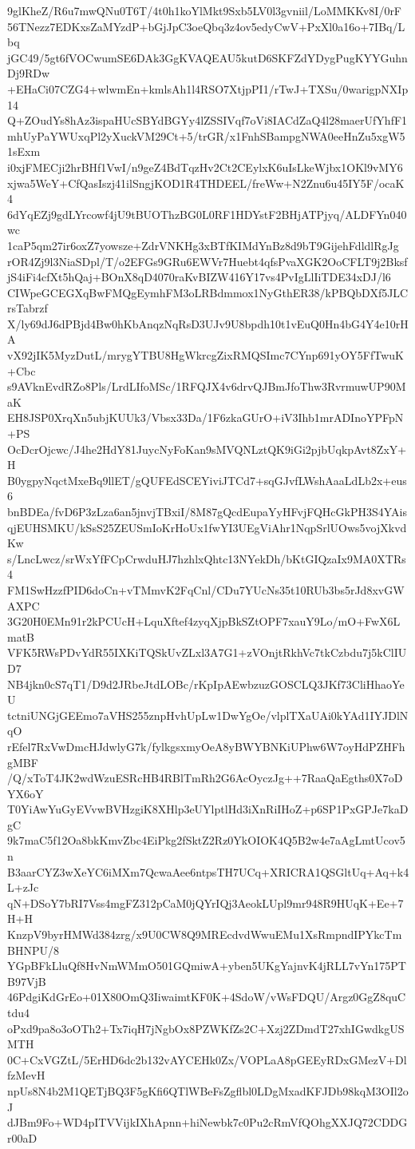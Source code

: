 9glKheZ/R6u7mwQNu0T6T/4t0h1koYlMkt9Sxb5LV0l3gvniil/LoMMKKv8I/0rF
56TNezz7EDKxsZaMYzdP+bGjJpC3oeQbq3z4ov5edyCwV+PxXl0a16o+7IBq/Lbq
jGC49/5gt6fVOCwumSE6DAk3GgKVAQEAU5kutD6SKFZdYDygPugKYYGuhnDj9RDw
+EHaCi07CZG4+wlwmEn+kmlsAh1l4RSO7XtjpPI1/rTwJ+TXSu/0warigpNXIp14
Q+ZOudYs8hAz3ispaHUcSBYdBGYy4lZSSIVqf7oVi8IACdZaQ4l28maerUfYhfF1
mhUyPaYWUxqPl2yXuckVM29Ct+5/trGR/x1FnhSBampgNWA0eeHnZu5xgW51sExm
i0xjFMECji2hrBHf1VwI/n9geZ4BdTqzHv2Ct2CEylxK6uIsLkeWjbx1OKl9vMY6
xjwa5WeY+CfQasIszj41ilSngjKOD1R4THDEEL/freWw+N2Znu6u45IY5F/ocaK4
6dYqEZj9gdLYrcowf4jU9tBUOThzBG0L0RF1HDYstF2BHjATPjyq/ALDFYn040wc
1caP5qm27ir6oxZ7yowsze+ZdrVNKHg3xBTfKIMdYnBz8d9bT9GijehFdldlRgJg
rOR4Zj9l3NiaSDpl/T/o2EFGs9GRu6EWVr7Huebt4qfsPvaXGK2OoCFLT9j2Bksf
jS4iFi4cfXt5hQaj+BOnX8qD4070raKvBIZW416Y17vs4PvIgLlIiTDE34xDJ/l6
CIWpeGCEGXqBwFMQgEymhFM3oLRBdmmox1NyGthER38/kPBQbDXf5JLCrsTabrzf
X/ly69dJ6dPBjd4Bw0hKbAnqzNqRsD3UJv9U8bpdh10t1vEuQ0Hn4bG4Y4e10rHA
vX92jIK5MyzDutL/mrygYTBU8HgWkrcgZixRMQSImc7CYnp691yOY5FfTwuK+Cbc
s9AVknEvdRZo8Pls/LrdLIfoMSc/1RFQJX4v6drvQJBmJfoThw3RvrmuwUP90MaK
EH8JSP0XrqXn5ubjKUUk3/Vbsx33Da/1F6zkaGUrO+iV3Ihb1mrADInoYPFpN+PS
OcDcrOjcwc/J4he2HdY81JuycNyFoKan9sMVQNLztQK9iGi2pjbUqkpAvt8ZxY+H
B0ygpyNqctMxeBq9llET/gQUFEdSCEYiviJTCd7+sqGJvfLWshAaaLdLb2x+eus6
bnBDEa/fvD6P3zLza6an5jnvjTBxiI/8M87gQcdEupaYyHFvjFQHcGkPH3S4YAis
qjEUHSMKU/kSsS25ZEUSmIoKrHoUx1fwYI3UEgViAhr1NqpSrlUOws5vojXkvdKw
s/LncLwcz/srWxYfFCpCrwduHJ7hzhlxQhtc13NYekDh/bKtGIQzaIx9MA0XTRs4
FM1SwHzzfPID6doCn+vTMmvK2FqCnl/CDu7YUcNs35t10RUb3bs5rJd8xvGWAXPC
3G20H0EMn91r2kPCUcH+LquXftef4zyqXjpBkSZtOPF7xauY9Lo/mO+FwX6LmatB
VFK5RWsPDvYdR55IXKiTQSkUvZLxl3A7G1+zVOnjtRkhVc7tkCzbdu7j5kClIUD7
NB4jkn0cS7qT1/D9d2JRbeJtdLOBc/rKpIpAEwbzuzGOSCLQ3JKf73CliHhaoYeU
tctniUNGjGEEmo7aVHS255znpHvhUpLw1DwYgOe/vlplTXaUAi0kYAd1IYJDlNqO
rEfel7RxVwDmcHJdwlyG7k/fylkgsxmyOeA8yBWYBNKiUPhw6W7oyHdPZHFhgMBF
/Q/xToT4JK2wdWzuESRcHB4RBlTmRh2G6AcOyczJg++7RaaQaEgths0X7oDYX6oY
T0YiAwYuGyEVvwBVHzgiK8XHlp3eUYlptlHd3iXnRiIHoZ+p6SP1PxGPJe7kaDgC
9k7maC5f12Oa8bkKmvZbc4EiPkg2fSktZ2Rz0YkOIOK4Q5B2w4e7aAgLmtUcov5n
B3aarCYZ3wXeYC6iMXm7QcwaAee6ntpsTH7UCq+XRICRA1QSGltUq+Aq+k4L+zJc
qN+DSoY7bRI7Vss4mgFZ312pCaM0jQYrIQj3AeokLUpl9mr948R9HUqK+Ee+7H+H
KnzpV9byrHMWd384zrg/x9U0CW8Q9MREcdvdWwuEMu1XsRmpndIPYkcTmBHNPU/8
YGpBFkLluQf8HvNmWMmO501GQmiwA+yben5UKgYajnvK4jRLL7vYn175PTB97VjB
46PdgiKdGrEo+01X80OmQ3IiwaimtKF0K+4SdoW/vWsFDQU/Argz0GgZ8quCtdu4
oPxd9pa8o3oOTh2+Tx7iqH7jNgbOx8PZWKfZs2C+Xzj2ZDmdT27xhIGwdkgUSMTH
0C+CxVGZtL/5ErHD6dc2b132vAYCEHk0Zx/VOPLaA8pGEEyRDxGMezV+DlfzMevH
npUs8N4b2M1QETjBQ3F5gKfi6QTlWBeFsZgflbl0LDgMxadKFJDb98kqM3OIl2oJ
dJBm9Fo+WD4pITVVijkIXhApnn+hiNewbk7c0Pu2cRmVfQOhgXXJQ72CDDGr00aD
